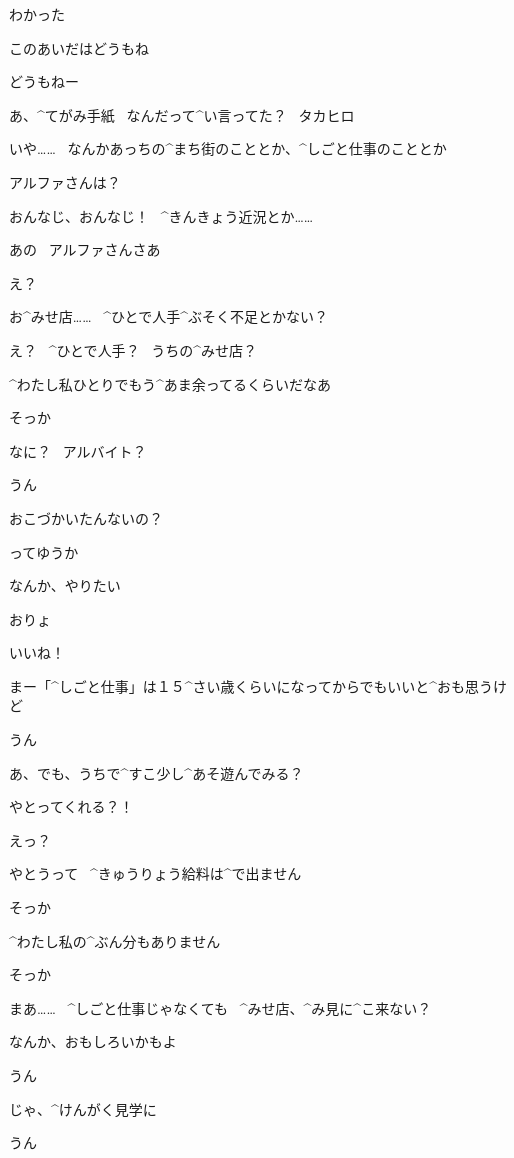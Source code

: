 \Makki わかった

\page
\Makki このあいだはどうもね

\Alpha どうもねー

\Alpha あ、^{てがみ}{手紙}
\ なんだって^{い}{言}ってた？
\ タカヒロ

\Makki いや……
\ なんかあっちの^{まち}{街}のこととか、^{しごと}{仕事}のこととか

\Makki アルファさんは？

\Alpha おんなじ、おんなじ！
\ ^{きんきょう}{近況}とか……

\page
\Makki あの
\ アルファさんさあ

\Alpha え？

\Makki お^{みせ}{店}……
\ ^{ひとで}{人手}^{ぶそく}{不足}とかない？

\Alpha え？
\ ^{ひとで}{人手}？
\ うちの^{みせ}{店}？

\Alpha ^{わたし}{私}ひとりでもう^{あま}{余}ってるくらいだなあ

\Makki そっか

\page
\Alpha なに？
\ アルバイト？

\Makki うん

\Alpha おこづかいたんないの？

\Makki ってゆうか

\Makki なんか、やりたい

\Alpha おりょ

\Alpha いいね！

\Alpha まー「^{しごと}{仕事}」は１５^{さい}{歳}くらいになってからでもいいと^{おも}{思}うけど

\page
\Makki うん

\Alpha あ、でも、うちで^{すこ}{少}し^{あそ}{遊}んでみる？

\Makki やとってくれる？！

\Alpha えっ？

\Alpha やとうって
\ ^{きゅうりょう}{給料}は^{で}{出}ません

\Makki そっか

\Alpha ^{わたし}{私}の^{ぶん}{分}もありません

\Makki そっか

\page
\Alpha まあ……
\ ^{しごと}{仕事}じゃなくても
\ ^{みせ}{店}、^{み}{見}に^{こ}{来}ない？

\Alpha なんか、おもしろいかもよ

\Makki うん

\Alpha じゃ、^{けんがく}{見学}に

\Makki うん

